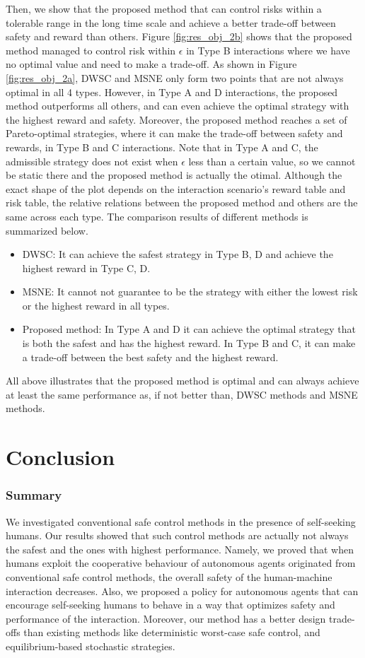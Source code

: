 \documentclass[letterpaper]{article} %
\begin{document}
Then, we show that the proposed method that can control risks within a tolerable range in the long time scale and achieve a better trade-off between safety and reward than others.
Figure \ref{fig:res_obj_2b} shows that the proposed method managed to control risk within $\epsilon$ in Type B interactions where we have no optimal value and need to make a trade-off.
As shown in Figure \ref{fig:res_obj_2a}, DWSC and MSNE only form two points that are not always optimal in all 4 types. However, in Type A and D interactions, the proposed method outperforms all others, and can even achieve the optimal strategy with the highest reward and safety. Moreover, the proposed method reaches a set of Pareto-optimal strategies, where it can make the trade-off between safety and rewards, in Type B and C interactions. Note that in Type A and C, the admissible strategy does not exist when $\epsilon$ less than a certain value, so we cannot be static there and the proposed method is actually the otimal. Although the exact shape of the plot depends on the interaction scenario's reward table and risk table, the relative relations between the proposed method and others are the same across each type.
The comparison results of different methods is summarized below.
\begin{itemize}
    \item DWSC: It can achieve the safest strategy in Type B, D and achieve the highest reward in Type C, D.
    \item MSNE: It cannot not guarantee to be the strategy with either the lowest risk or the highest reward in all types.
    \item Proposed method: In Type A and D it can achieve the optimal strategy that is both the safest and has the highest reward. In Type B and C, it can make a trade-off between the best safety and the highest reward.
\end{itemize}
All above illustrates that the proposed method is optimal and can always achieve at least the same performance as, if not better than, DWSC methods and MSNE methods.



\section{Conclusion}
\subsubsection{Summary}
We investigated conventional safe control methods in the presence of self-seeking humans. Our results showed that such control methods are actually not always the safest and the ones with highest performance.  Namely, we proved that when humans exploit the cooperative behaviour of autonomous agents originated from conventional safe control methods, the overall safety of the human-machine interaction decreases. Also, we proposed a policy for autonomous agents that can encourage self-seeking humans to behave in a way that optimizes safety and performance of the interaction. Moreover, our method has a better design trade-offs than existing methods like deterministic worst-case safe control, and equilibrium-based stochastic strategies.
\end{document}
